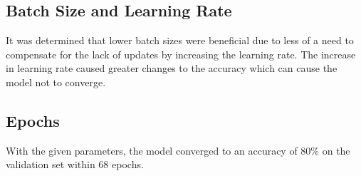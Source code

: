 \documentclass[../main.tex]{subfiles}
\begin{document}
\subsection{Batch Size and Learning Rate}

It was determined that lower batch sizes were beneficial due to less of a need to compensate for the lack of updates by increasing the learning rate. The increase in learning rate caused greater changes to the accuracy which can cause the model not to converge. 

\subsection{Epochs}
With the given parameters, the model converged to an accuracy of 80\% on the validation set within 68 epochs. 
\end{document}
